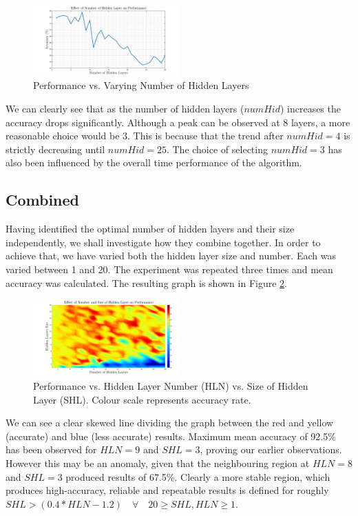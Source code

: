 \documentclass[10pt,twocolumn,letterpaper]{article}
\begin{document}
\begin{figure}[H]
\centering
\includegraphics[width=0.5\textwidth]{../results/NN_HiddenLayerNum}
\caption{Performance vs. Varying Number of Hidden Layers
\label{fig:HidNum}}
\end{figure}

We can clearly see that as the number of hidden layers ($numHid$) increases the accuracy drops significantly. Although a peak can be observed at 8 layers, a more reasonable choice would be 3. This is because that the trend after $numHid = 4$ is strictly decreasing until $numHid = 25$. The choice of selecting $numHid = 3$ has also been influenced by the overall time performance of the algorithm.
\subsection{Combined}

Having identified the optimal number of hidden layers and their size independently, we shall investigate how they combine together. In order to achieve that, we have varied both the hidden layer size and number. Each was varied between 1 and 20. The experiment was repeated three times and mean accuracy was calculated. The resulting graph is shown in Figure \ref{fig:NNSizeNum}.

\begin{figure}[H]
\centering
\includegraphics[width=0.5\textwidth]{../results/NN_HidLay_Num_Size4}
\caption{Performance vs. Hidden Layer Number (HLN) vs. Size of Hidden Layer (SHL). Colour scale represents accuracy rate.
\label{fig:NNSizeNum}}
\end{figure}

We can see a clear skewed line dividing the graph between the red and yellow (accurate) and blue (less accurate) results. Maximum mean accuracy of 92.5\% has been observed for $HLN = 9$ and $SHL = 3$, proving our earlier observations. However this may be an anomaly, given that the neighbouring region at $HLN = 8$ and $SHL = 3$ produced results of 67.5\%. Clearly a more stable region, which produces high-accuracy, reliable and repeatable results is defined for roughly $SHL > (0.4*HLN-1.2) \quad \forall \quad 20 \geq SHL, HLN \geq 1$.
\end{document}
